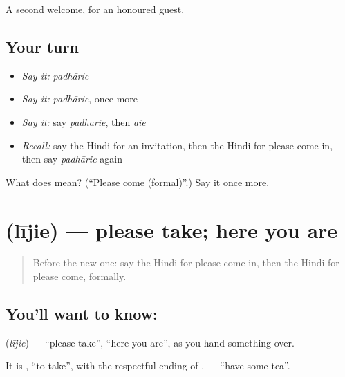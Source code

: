 \begin{grammarlens}[title={What you've built}]
A second welcome, for an honoured guest.
\end{grammarlens}

\subsection*{Your turn}
\begin{itemize}
\raggedright
  \item \emph{Say it:} \emph{padhārie}
  \item \emph{Say it:} \emph{padhārie}, once more
  \item \emph{Say it:} say \emph{padhārie}, then \emph{āie}
  \item \emph{Recall:} say the Hindi for an invitation, then the Hindi for please come in, then say \emph{padhārie} again
\end{itemize}

\begin{tcolorbox}[breakable,colback=teal!4,colframe=teal!35!black,title={Before you move on}]
What does  mean? (\textquotedblleft{}Please come (formal)\textquotedblright{}.) Say it once more.
\end{tcolorbox}
\section[\texorpdfstring{\hi{लीजिए} (lījie)}{लीजिए (lījie)}]{ (lījie) — please take; here you are}

\label{lesson:HI-C115-lijie}



\begin{quote}
Before the new one: say the Hindi for please come in, then the Hindi for please come, formally.
\end{quote}

\subsection*{You'll want to know: }
\textbf{} (\emph{lījie}) — \textquotedblleft{}please take\textquotedblright{}, \textquotedblleft{}here you are\textquotedblright{}, as you hand something over.

It is \textbf{}, \textquotedblleft{}to take\textquotedblright{}, with the respectful ending of \textbf{}. \textbf{ } — \textquotedblleft{}have some tea\textquotedblright{}.

